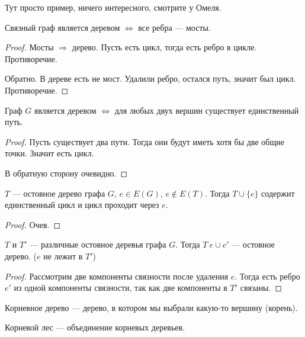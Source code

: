 Тут просто пример, ничего интересного, смотрите у Омеля.
\begin{statement}
Связный граф является деревом $\iff$ все ребра --- мосты.    
\end{statement}
\begin{proof}
    Мосты $\Rightarrow$ дерево. Пусть есть цикл, тогда есть ребро в цикле. Противоречие.

    Обратно. В дереве есть не мост. Удалили ребро, остался путь, значит был цикл. Противоречие.
\end{proof}
\begin{statement}
    Граф $G$ является деревом  $\iff$ для любых двух вершин существует единственный путь.
\end{statement}
\begin{proof}
    Пусть существует два пути. Тогда они будут иметь хотя бы две общие точки. Значит есть цикл.

    В обратную сторону очевидно.
\end{proof}
\begin{consequence}
    $T$ --- остовное дерево графа  $G$,  $e \in E(G)$, $e \not \in E(T)$. Тогда  $T \cup \{e\}$ содержит единственный цикл и цикл проходит через  $e$.
\end{consequence}
\begin{proof}
    Очев.
\end{proof}
\begin{statement}
    $T$ и  $T'$ --- различные остовное деревья графа  $G$. Тогда $T \ e \cup e'$ --- остовное дерево. ($e$ не лежит в  $T'$)
\end{statement}
\begin{proof}
    Рассмотрим две компоненты связности после удаления $e$. Тогда есть ребро $e'$ из одной компоненты связности, так как две компоненты в $T'$ связаны.
\end{proof}
\begin{definition}
    Корневное дерево --- дерево, в котором мы выбрали какую-то вершину (корень).
\end{definition}
\begin{definition}
    Корневой лес --- объединение корневых деревьев.
\end{definition}
